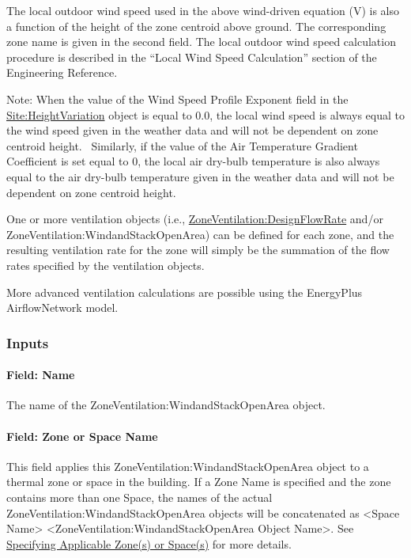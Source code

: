 The local outdoor wind speed used in the above wind-driven equation (V) is also a function of the height of the zone centroid above ground. The corresponding zone name is given in the second field. The local outdoor wind speed calculation procedure is described in the ``Local Wind Speed Calculation'' section of the Engineering Reference.

Note: When the value of the Wind Speed Profile Exponent field in the \hyperref[siteheightvariation]{Site:HeightVariation} object is equal to 0.0, the local wind speed is always equal to the wind speed given in the weather data and will not be dependent on zone centroid height.~ Similarly, if the value of the Air Temperature Gradient Coefficient is set equal to 0, the local air dry-bulb temperature is also always equal to the air dry-bulb temperature given in the weather data and will not be dependent on zone centroid height.

One or more ventilation objects (i.e., \hyperref[zoneventilationdesignflowrate]{ZoneVentilation:DesignFlowRate} and/or ZoneVentilation:WindandStackOpenArea) can be defined for each zone, and the resulting ventilation rate for the zone will simply be the summation of the flow rates specified by the ventilation objects.

More advanced ventilation calculations are possible using the EnergyPlus AirflowNetwork model.

\subsubsection{Inputs}\label{inputs-3-004}

\paragraph{Field: Name}\label{field-name-3-004}

The name of the ZoneVentilation:WindandStackOpenArea object.

\paragraph{Field: Zone or Space Name}\label{field-zone-name-2016-06-16}

This field applies this ZoneVentilation:WindandStackOpenArea object to a thermal zone or space in the building. If a Zone Name is specified and the zone contains more than one Space, the names of the actual ZoneVentilation:WindandStackOpenArea objects will be concatenated as \textless{}Space Name\textgreater{} \textless{}ZoneVentilation:WindandStackOpenArea Object Name\textgreater{}. See \hyperref[specifying-applicable-zones-or-spaces]{Specifying Applicable Zone(s) or Space(s)} for more details.

